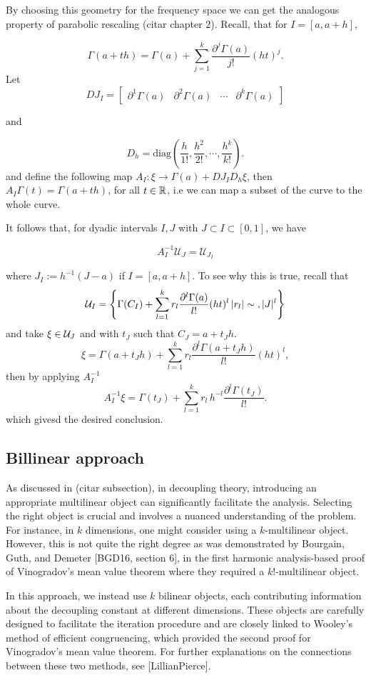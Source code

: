 By choosing this geometry for the frequency space we can get the analogous property of parabolic rescaling (citar chapter 2).
Recall, that for $I=[a,a+h]$,

$$
\Gamma(a+th)= \Gamma(a)+ \sum_{j=1}^{k}\frac{\partial^{j}\Gamma(a)}{j!}(ht)^j.
$$
Let
\[
DJ_I = \left[ \begin{array}{c|c|c|c}
\partial^1 \Gamma(a) & \partial^2 \Gamma(a) & \cdots & \partial^k \Gamma(a)
\end{array} \right]
\]

and

\[
D_h = \mathrm{diag}\left(\frac{h}{1!}, \frac{h^2}{2!}, \cdots, \frac{h^k}{k!}\right).
\] and define the following map $A_I:\xi \xrightarrow{} \Gamma(a)+DJ_I D_h \xi$, then $A_I\Gamma(t)=\Gamma(a+th)$, for all $t\in \mathbb{R}$, i.e we can map a subset of the curve to the whole curve. 

It follows that, for dyadic intervals $I, J$ with $J \subset I \subset[0,1]$, we have

$$
A_{I}^{-1} \mathcal{U}_{J}=\mathcal{U}_{J_{I}}
$$

where $J_{I}:=h^{-1}(J-a)$ if $I=[a, a+h]$. 
To see why this is true, recall that
$$
\mathcal{U}_{I}= \left\{ \Gamma(C_I)+\sum_{l=1}^{k} r_l \frac{\partial^{l}\Gamma(a)}{l!}(ht)^l\, |r_l|\sim\text{,}\, |J|^l\right\}
$$
and take $\xi\in \mathcal{U}_{J}$ and with $t_J$ such that $C_J= a+t_J h$.
$$
\xi = \Gamma(a+t_J h)+\sum_{l=1}^{k} r_l \frac{\partial^{l}\Gamma(a+t_J h)}{l!}(ht)^l,
$$
then by applying $A^{-1}_I$ 
$$
A^{-1}_I\xi = \Gamma(t_J)+\sum_{l=1}^{k} r_l\,h^{-l} \frac{\partial^{l}\Gamma(t_J)}{l!}.
$$
which givesd the desired conclusion.
\subsection{Billinear approach}
As discussed in (citar subsection), in decoupling theory, introducing an appropriate multilinear object can significantly facilitate the analysis. Selecting the right object is crucial and involves a nuanced understanding of the problem. For instance, in $k$ dimensions, one might consider using a $k$-multilinear object. However, this is not quite the right degree as was demonstrated by Bourgain, Guth, and Demeter [BGD16, section 6], in the first harmonic analysis-based proof of Vinogradov's mean value theorem where they required a $k!$-multilinear object.   

In this approach, we instead use $k$ bilinear objects, each contributing information about the decoupling constant at different dimensions. These objects are carefully designed to facilitate the iteration procedure and are closely linked to Wooley's method of efficient congruencing, which provided the second proof for Vinogradov's mean value theorem. For further explanations on the connections between these two methods, see [LillianPierce].



